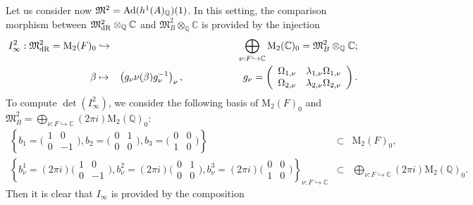 \documentclass{amsart}
\theoremstyle{definition}
\theoremstyle{remark}
\numberwithin{equation}{section}
\newcommand{\M}{\mathrm{M}}
\newcommand{\mfM}{{\mathfrak M}}
\newcommand{\Q}{{\mathbb Q}}
\newcommand{\C}{{\mathbb C}}
\begin{document}
Let us consider now $\mfM^2={\rm Ad}(h^1(A)_\Q)(1)$. In this setting, the comparison morphism between $\mfM^2_{\rm dR}\otimes_\Q\C$ and $\mfM^2_B\otimes_\Q\C$ is provided by the injection
\begin{eqnarray*}
I^2_{\infty}:\mfM^2_{\rm dR}=\M_2(F)_0&\hookrightarrow& \bigoplus_{{\nu}:F\hookrightarrow\C}\M_2(\C)_0=\mfM^2_B\otimes_\Q\C;\\ 
\beta&\mapsto& \left(g_{\nu} {\nu}(\beta)g_{\nu}^{-1}\right)_{\nu},\qquad\qquad\qquad g_{\nu}=\left(\begin{array}{cc}\Omega_{1,{\nu}}&\lambda_{1,{\nu}}\Omega_{1,{\nu}}\\\Omega_{2,{\nu}}&\lambda_{2,{\nu}}\Omega_{2,{\nu}}\end{array}\right).
\end{eqnarray*}
To compute $\det(I^2_\infty)$, we consider the following basis of $\M_2(F)_0$ and $\mfM_B^2=\bigoplus_{\nu:F\hookrightarrow\C}(2\pi i)\M_2(\Q)_0$:
\begin{eqnarray*}
\left\{b_1=\big(\begin{smallmatrix}1&0\\ 0&-1\end{smallmatrix}\big),b_2=\big(\begin{smallmatrix}0&1\\ 0&0\end{smallmatrix}\big),b_3=\big(\begin{smallmatrix}0&0\\ 1&0\end{smallmatrix}\big)\right\}&\subset&\M_2(F)_0,\\
 \left\{b_\nu^1=(2\pi i)\big(\begin{smallmatrix}1&0\\ 0&-1\end{smallmatrix}\big),b_\nu^2=(2\pi i)\big(\begin{smallmatrix}0&1\\ 0&0\end{smallmatrix}\big),b_\nu^3=(2\pi i)\big(\begin{smallmatrix}0&0\\ 1&0\end{smallmatrix}\big)\right\}_{\nu:F\hookrightarrow\C}&\subset&\bigoplus_{\nu:F\hookrightarrow\C}(2\pi i)\M_2(\Q)_0.
\end{eqnarray*}
Then it is clear that $I_\infty$ is provided by the composition
\end{document}
